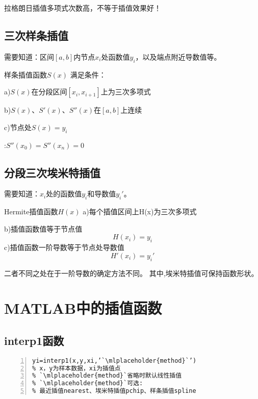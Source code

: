 \begin{note}
拉格朗日插值多项式次数高，不等于插值效果好！
\end{note}
\subsection{三次样条插值}
需要知道：区间$[a,b]$内节点$x_i$处函数值$y_i$，以及端点附近导数值等。
\begin{definition}{样条插值函数$S(x)$}{}
满足条件：

a)$S(x)$在分段区间$[x_i,x_{i+1}]$上为三次多项式

b)$S(x)$、$S'(x)$、$S''(x)$在$[a,b]$上连续

c)节点处$S(x)=y_i$

\end{definition}
\begin{note}
:\quad $S''(x_0)=S''(x_n)=0$
\end{note}

\subsection{分段三次埃米特插值}
需要知道：$x_i$处的函数值$y_i$和导数值$y_i'$。
\begin{definition}{Hermite插值函数$H(x)$}{}
a)每个插值区间上H(x)为三次多项式

b)插值函数值等于节点值
\[H(x_i)=y_i
\]
c)插值函数一阶导数等于节点处导数值
\[H'(x_i)=y_i'
\]
\end{definition}

\begin{note}
二者不同之处在于一阶导数的确定方法不同。
其中,埃米特插值可保持函数形状。
\end{note}

\newpage

\section{MATLAB中的插值函数}
\subsection{interp1函数}
\begin{lstlisting}[frame=single,numbers=left]
% 调用格式
yi=interp1(x,y,xi,’`\mlplaceholder{method}`’)
% x，y为样本数据，xi为插值点
% `\mlplaceholder{method}`省略时默认线性插值
% `\mlplaceholder{method}`可选:
% 最近插值nearest、埃米特插值pchip、样条插值spline
\end{lstlisting}

